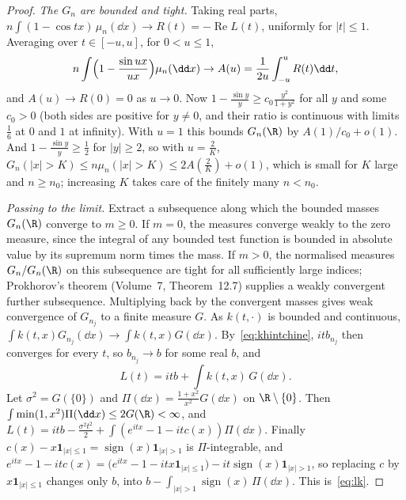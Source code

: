 \begin{proof}
\emph{The $G_n$ are bounded and tight.} Taking real parts, $n\int(1-\cos tx)\,\mu_n(\dd x)\to R(t)=-\operatorname{Re}L(t)$, uniformly for $|t|\le1$. Averaging
over $t\in[-u,u]$, for $0<u\le1$,
\[
n\int\Bigl(1-\frac{\sin ux}{ux}\Bigr)\mu_n(\dd x)\to A(u)=\frac1{2u}\int_{-u}^uR(t)\dd t,
\]
and $A(u)\to R(0)=0$ as $u\to0$. Now $1-\frac{\sin y}y\ge c_0\frac{y^2}{1+y^2}$ for all $y$ and some $c_0>0$ (both sides are positive for $y\ne0$, and their ratio
is continuous with limits $\frac16$ at $0$ and $1$ at infinity). With $u=1$ this bounds $G_n(\R)$ by $A(1)/c_0+o(1)$. And $1-\frac{\sin y}y\ge\frac12$ for $|y|\ge2$, so
with $u=\frac2K$, $G_n(|x|>K)\le n\mu_n(|x|>K)\le2A(\frac2K)+o(1)$, which is small for $K$ large and $n\ge n_0$; increasing $K$ takes care of the finitely
many $n<n_0$.

\emph{Passing to the limit.} Extract a subsequence along which the bounded masses $G_n(\R)$ converge to $m\ge0$. If $m=0$, the measures converge weakly to the zero measure, since the integral of any bounded test function is bounded in absolute value by its supremum norm times the mass. If $m>0$, the normalised measures $G_n/G_n(\R)$ on this subsequence are tight for all sufficiently large indices; Prokhorov's theorem (Volume~7, Theorem~12.7) supplies a weakly convergent further subsequence. Multiplying back by the convergent masses gives weak convergence of $G_{n_j}$ to a finite measure $G$. As $k(t,\cdot)$ is bounded and continuous,
$\int k(t,x)G_{n_j}(\dd x)\to\int k(t,x)G(\dd x)$. By~\eqref{eq:khintchine}, $itb_{n_j}$ then converges for every $t$, so $b_{n_j}\to b$ for some real $b$, and
\[
L(t)=itb+\int k(t,x)\,G(\dd x).
\]
Let $\sigma^2=G(\{0\})$ and $\Pi(\dd x)=\frac{1+x^2}{x^2}G(\dd x)$ on $\R\setminus\{0\}$. Then $\int\min(1,x^2)\Pi(\dd x)\le2G(\R)<\infty$, and
$L(t)=itb-\frac{\sigma^2t^2}2+\int(e^{itx}-1-itc(x))\Pi(\dd x)$. Finally $c(x)-x\mathbf 1_{|x|\le1}=\operatorname{sign}(x)\mathbf 1_{|x|>1}$ is $\Pi$-integrable, and
$e^{itx}-1-itc(x)=\bigl(e^{itx}-1-itx\mathbf 1_{|x|\le1}\bigr)-it\operatorname{sign}(x)\mathbf 1_{|x|>1}$, so
replacing $c$ by $x\mathbf 1_{|x|\le1}$ changes only $b$, into $b-\int_{|x|>1}\operatorname{sign}(x)\,\Pi(\dd x)$. This is~\eqref{eq:lk}.


\end{proof}
